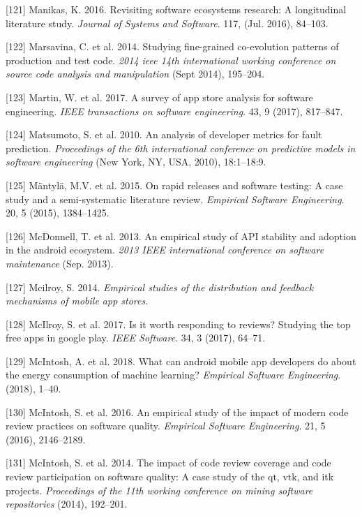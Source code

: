 \documentclass[]{book}
\begin{document}
\hypertarget{ref-Manikas2016}{}
{[}121{]} Manikas, K. 2016. Revisiting software ecosystems research: A
longitudinal literature study. \emph{Journal of Systems and Software}.
117, (Jul. 2016), 84--103.

\hypertarget{ref-marsavina2014}{}
{[}122{]} Marsavina, C. et al. 2014. Studying fine-grained co-evolution
patterns of production and test code. \emph{2014 ieee 14th international
working conference on source code analysis and manipulation} (Sept
2014), 195--204.

\hypertarget{ref-martin2015survey}{}
{[}123{]} Martin, W. et al. 2017. A survey of app store analysis for
software engineering. \emph{IEEE transactions on software engineering}.
43, 9 (2017), 817--847.

\hypertarget{ref-Matsumoto2010}{}
{[}124{]} Matsumoto, S. et al. 2010. An analysis of developer metrics
for fault prediction. \emph{Proceedings of the 6th international
conference on predictive models in software engineering} (New York, NY,
USA, 2010), 18:1--18:9.

\hypertarget{ref-mantyla2015a}{}
{[}125{]} Mäntylä, M.V. et al. 2015. On rapid releases and software
testing: A case study and a semi-systematic literature review.
\emph{Empirical Software Engineering}. 20, 5 (2015), 1384--1425.

\hypertarget{ref-McDonnell2013}{}
{[}126{]} McDonnell, T. et al. 2013. An empirical study of API stability
and adoption in the android ecosystem. \emph{2013 IEEE international
conference on software maintenance} (Sep. 2013).

\hypertarget{ref-mcilroy2014empirical}{}
{[}127{]} Mcilroy, S. 2014. \emph{Empirical studies of the distribution
and feedback mechanisms of mobile app stores}.

\hypertarget{ref-mcilroy2017worth}{}
{[}128{]} McIlroy, S. et al. 2017. Is it worth responding to reviews?
Studying the top free apps in google play. \emph{IEEE Software}. 34, 3
(2017), 64--71.

\hypertarget{ref-MSA2018}{}
{[}129{]} McIntosh, A. et al. 2018. What can android mobile app
developers do about the energy consumption of machine learning?
\emph{Empirical Software Engineering}. (2018), 1--40.

\hypertarget{ref-mcintosh2016empirical}{}
{[}130{]} McIntosh, S. et al. 2016. An empirical study of the impact of
modern code review practices on software quality. \emph{Empirical
Software Engineering}. 21, 5 (2016), 2146--2189.

\hypertarget{ref-mcintosh2014impact}{}
{[}131{]} McIntosh, S. et al. 2014. The impact of code review coverage
and code review participation on software quality: A case study of the
qt, vtk, and itk projects. \emph{Proceedings of the 11th working
conference on mining software repositories} (2014), 192--201.
\end{document}
